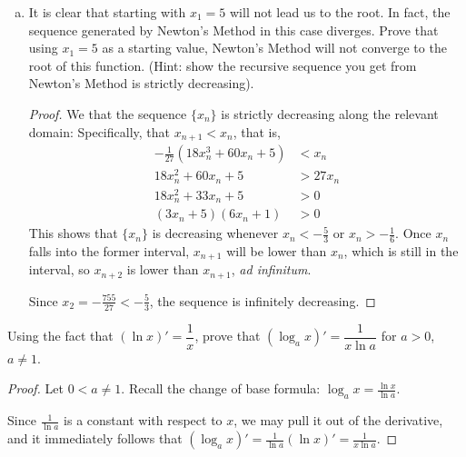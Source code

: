 \documentclass{agony}
\begin{document}
\begin{enumerate}[(a)]
\begin{proof}[Solution]
\begin{alignat*}{4}
             & x_2 &  & = -\frac{1}{27}(18(5)^2+60(5)+5)                                         &  & = -\frac{755}{27}                 &  & \cong -27.96296     \\
             & x_3 &  & = -\frac{1}{27}(18(-755/27)^2+60(-755/27)+5)                             &  & = -\frac{1004555}{2187}           &  & \cong -459.33013    \\
             & x_3 &  & = -\frac{1}{27}(18(-\frac{1004555}{2187})^2+60(-\frac{1004555}{2187})+5) &  & = -\frac{2003617741355}{14348907} &  & \cong -139635.56537
          \end{alignat*}
          This is\dots not converging.
        \end{proof}
  \item It is clear that starting with $x_1=5$ will not lead us to the root.
        In fact, the sequence generated by Newton's Method in this case diverges.
        Prove that using $x_1=5$ as a starting value,
        Newton's Method will not converge to the root of this function.
        (Hint: show the recursive sequence you get from Newton's Method is strictly decreasing).
        \begin{proof}
          We that the sequence $\{x_n\}$ is strictly decreasing along the relevant domain:
          Specifically, that $x_{n+1} < x_n$, that is,
          \begin{align*}
            -\frac{1}{27}(18x_n^3 + 60x_n + 5) & < x_n   \\
            18x_n^2 + 60x_n + 5                & > 27x_n \\
            18x_n^2 + 33x_n + 5                & > 0     \\
            (3x_n+5)(6x_n+1)                   & > 0
          \end{align*}
          This shows that $\{x_n\}$ is decreasing whenever $x_n < -\frac53$ or $x_n > -\frac16$.
          Once $x_n$ falls into the former interval, $x_{n+1}$ will be lower than $x_n$,
          which is still in the interval, so $x_{n+2}$ is lower than $x_{n+1}$, \emph{ad infinitum}.

          Since $x_2=-\frac{755}{27} < -\frac{5}{3}$, the sequence is infinitely decreasing.
        \end{proof}
\end{enumerate}


\question Using the fact that $(\ln x)' = \dfrac{1}{x}$,
prove that $(\log_a x)'=\dfrac{1}{x\ln a}$ for $a > 0$, $a \neq 1$.
\begin{proof}
  Let $0 < a \neq 1$.
  Recall the change of base formula: $\log_a x = \frac{\ln x}{\ln a}$.

  Since $\frac{1}{\ln a}$ is a constant with respect to $x$, we may pull it out of the derivative,
  and it immediately follows that $(\log_a x)' = \frac{1}{\ln a}(\ln x)' = \frac{1}{x\ln a}$.
\end{proof}
\end{document}
